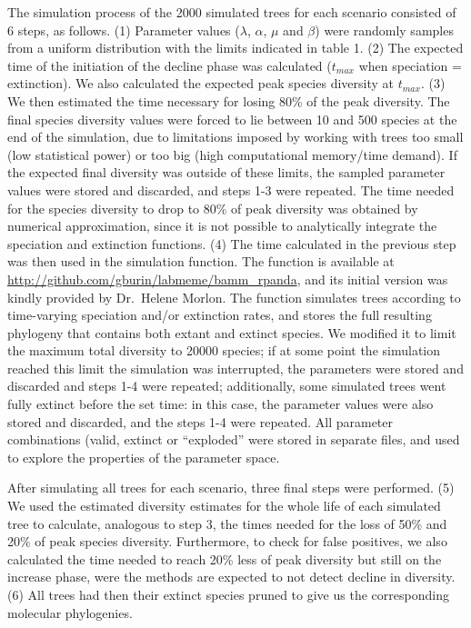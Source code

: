 \documentclass[12pt,]{article}
\begin{document}
The simulation process of the 2000 simulated trees for each scenario
consisted of 6 steps, as follows. (1) Parameter values (\(\lambda\),
\(\alpha\), \(\mu\) and \(\beta\)) were randomly samples from a uniform
distribution with the limits indicated in table 1. (2) The expected time
of the initiation of the decline phase was calculated (\(t_{max}\) when
speciation = extinction). We also calculated the expected peak species
diversity at \(t_{max}\). (3) We then estimated the time necessary for
losing 80\% of the peak diversity. The final species diversity values
were forced to lie between 10 and 500 species at the end of the
simulation, due to limitations imposed by working with trees too small
(low statistical power) or too big (high computational memory/time
demand). If the expected final diversity was outside of these limits,
the sampled parameter values were stored and discarded, and steps 1-3
were repeated. The time needed for the species diversity to drop to 80\%
of peak diversity was obtained by numerical approximation, since it is
not possible to analytically integrate the speciation and extinction
functions. (4) The time calculated in the previous step was then used in
the simulation function. The function is available at
\url{http://github.com/gburin/labmeme/bamm_rpanda}, and its initial
version was kindly provided by Dr.~Helene Morlon. The function simulates
trees according to time-varying speciation and/or extinction rates, and
stores the full resulting phylogeny that contains both extant and
extinct species. We modified it to limit the maximum total diversity to
20000 species; if at some point the simulation reached this limit the
simulation was interrupted, the parameters were stored and discarded and
steps 1-4 were repeated; additionally, some simulated trees went fully
extinct before the set time: in this case, the parameter values were
also stored and discarded, and the steps 1-4 were repeated. All
parameter combinations (valid, extinct or ``exploded'' were stored in
separate files, and used to explore the properties of the parameter
space.

After simulating all trees for each scenario, three final steps were
performed. (5) We used the estimated diversity estimates for the whole
life of each simulated tree to calculate, analogous to step 3, the times
needed for the loss of 50\% and 20\% of peak species diversity.
Furthermore, to check for false positives, we also calculated the time
needed to reach 20\% less of peak diversity but still on the increase
phase, were the methods are expected to not detect decline in diversity.
(6) All trees had then their extinct species pruned to give us the
corresponding molecular phylogenies.
\end{document}
